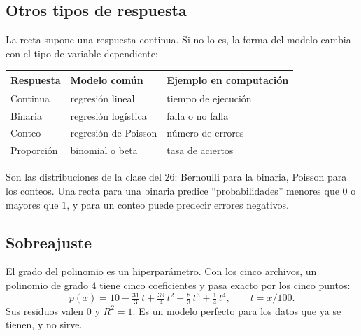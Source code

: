 \documentclass[11pt,letterpaper]{article}
\begin{document}

\subsection*{Otros tipos de respuesta}

La recta supone una respuesta continua. Si no lo es, la forma del
modelo cambia con el tipo de variable dependiente:

\begin{center}
\small
\begin{tabular}{lll}
    \toprule
    \textbf{Respuesta} & \textbf{Modelo común}
    & \textbf{Ejemplo en computación} \\
    \midrule
    Continua   & regresión lineal     & tiempo de ejecución \\
    Binaria    & regresión logística  & falla o no falla \\
    Conteo     & regresión de Poisson & número de errores \\
    Proporción & binomial o beta      & tasa de aciertos \\
    \bottomrule
\end{tabular}
\end{center}

Son las distribuciones de la clase del $26$: Bernoulli para la binaria,
Poisson para los conteos. Una recta para una binaria predice
``probabilidades'' menores que $0$ o mayores que $1$, y para un conteo
puede predecir errores negativos.


\subsection*{Sobreajuste}

El grado del polinomio es un hiperparámetro. Con los cinco archivos, un
polinomio de grado $4$ tiene cinco coeficientes y pasa exacto por los
cinco puntos:
\[
    p(x) = 10 - \tfrac{31}{3}\, t + \tfrac{39}{4}\, t^2
         - \tfrac{8}{3}\, t^3 + \tfrac{1}{4}\, t^4 ,
    \qquad t = x / 100 .
\]
Sus residuos valen $0$ y $R^2 = 1$. Es un modelo perfecto para los
datos que ya se tienen, y no sirve.
\end{document}
